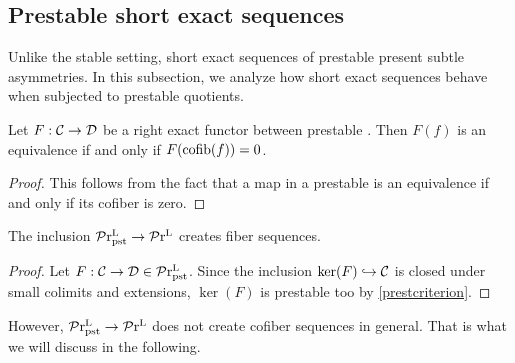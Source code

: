 \documentclass[a4paper,10pt, oneside]{amsart}
\begin{document}
	\subsection{Prestable short exact sequences}
	Unlike the stable setting, short exact sequences of prestable \infcats present subtle asymmetries. In this subsection, we analyze how short exact sequences behave when subjected to prestable quotients.
	\begin{lem}Let $F:\mathcal{C}\to \mathcal{D}$ be a right exact functor between prestable \infcats. Then $F(f)$ is an equivalence if and only if $F(\mathrm{cofib}(f))=0$.
	\end{lem}
	\begin{proof}
		This follows from the fact that a map in a prestable \infcat is an equivalence if and only if its cofiber is zero.
	\end{proof}
	\begin{prop}
		The inclusion $\mathcal{P}\mathrm{r}^\mathrm{L}_{\mathrm{pst}}\to \mathcal{P}\mathrm{r}^\mathrm{L}$ creates fiber sequences.
	\end{prop}
	\begin{proof}
		Let $F:\mathcal{C}\to\mathcal{D} \in \mathcal{P}\mathrm{r}^\mathrm{L}_{\mathrm{pst}}$.  Since the inclusion $\ker(F)\hookrightarrow\mathcal{C}$ is closed under small colimits and extensions, $\ker(F)$ is prestable too by \cref{prestcriterion}.
	\end{proof}
	
	However, $\mathcal{P}\mathrm{r}^\mathrm{L}_{\mathrm{pst}}\to \mathcal{P}\mathrm{r}^\mathrm{L}$ does not create cofiber sequences in general. That is what we will discuss in the following.
	
\end{document}

